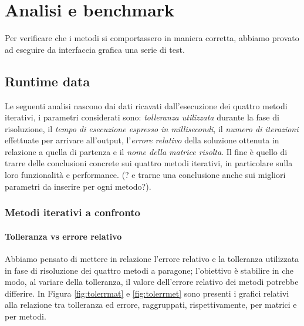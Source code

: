 \section{Analisi e benchmark}

Per verificare che i metodi si comportassero in maniera corretta, abbiamo provato ad eseguire da interfaccia grafica una serie di test.




\subsection{Runtime data}

Le seguenti analisi nascono dai dati ricavati dall'esecuzione dei quattro metodi iterativi, i parametri considerati sono: \textit{tolleranza utilizzata} durante la fase di risoluzione, il \textit{tempo di esecuzione espresso in millisecondi}, il \textit{numero di iterazioni} effettuate per arrivare all'output, l'\textit{errore relativo} della soluzione ottenuta in relazione a quella di partenza e il \textit{nome della matrice risolta}. Il fine è quello di trarre delle conclusioni concrete sui quattro metodi iterativi, in particolare sulla loro funzionalità e performance.
(? e trarne una conclusione anche sui migliori parametri da inserire per ogni metodo?).


\subsubsection{Metodi iterativi a confronto}

\paragraph{Tolleranza vs errore relativo}
Abbiamo pensato di mettere in relazione l'errore relativo e la tolleranza utilizzata in fase di risoluzione dei quattro metodi a paragone; l'obiettivo è stabilire in che modo, al variare della tolleranza, il valore dell'errore relativo dei metodi potrebbe differire. In Figura \ref{fig:tolerrmat} e \ref{fig:tolerrmet} sono presenti i grafici relativi alla relazione tra tolleranza ed errore, raggruppati, rispettivamente, per matrici e per metodi.




